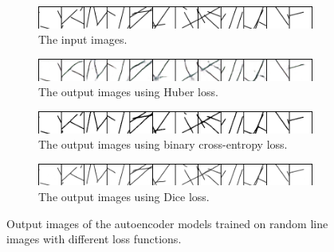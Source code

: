 \begin{figure}
    \centering
    \begin{subfigure}{\textwidth}
        \includegraphics[width=\textwidth]{graphics/work-artifacts/vae/43/real_img_VanillaVAE_8-0.png}
        \caption{The input images.}
    \end{subfigure}
    \begin{subfigure}{\textwidth}
        \includegraphics[width=\textwidth]{graphics/work-artifacts/vae/43/recons_VanillaVAE_8-0.png}
        \caption{The output images using Huber loss.}
    \end{subfigure}
    \begin{subfigure}{\textwidth}
        \includegraphics[width=\textwidth]{graphics/work-artifacts/vae/89/recons_VanillaVAE_4471-0.png}
        \caption{The output images using binary cross-entropy loss.}
    \end{subfigure}
    \begin{subfigure}{\textwidth}
        \includegraphics[width=\textwidth]{graphics/work-artifacts/vae/79/recons_VanillaVAE_2014-0.png}
        \caption{The output images using Dice loss.}
        \label{fig:ae.recons.dice}
    \end{subfigure}
    \caption{Output images of the autoencoder models trained on random line images with different loss functions.}
    \label{fig:vae.recons}
\end{figure}


